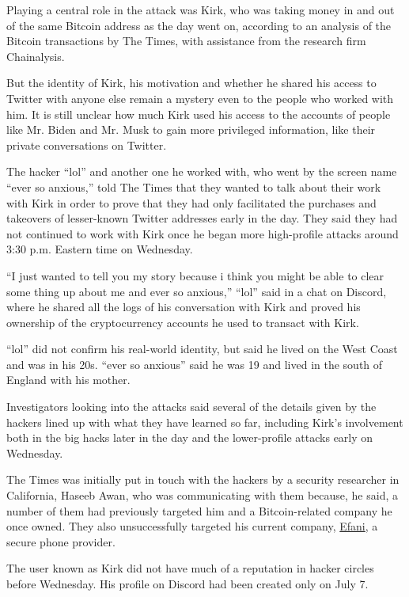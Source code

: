 Playing a central role in the attack was Kirk, who was taking money in
and out of the same Bitcoin address as the day went on, according to an
analysis of the Bitcoin transactions by The Times, with assistance from
the research firm Chainalysis.

But the identity of Kirk, his motivation and whether he shared his
access to Twitter with anyone else remain a mystery even to the people
who worked with him. It is still unclear how much Kirk used his access
to the accounts of people like Mr. Biden and Mr. Musk to gain more
privileged information, like their private conversations on Twitter.

The hacker ``lol'' and another one he worked with, who went by the
screen name ``ever so anxious,'' told The Times that they wanted to talk
about their work with Kirk in order to prove that they had only
facilitated the purchases and takeovers of lesser-known Twitter
addresses early in the day. They said they had not continued to work
with Kirk once he began more high-profile attacks around 3:30 p.m.
Eastern time on Wednesday.

``I just wanted to tell you my story because i think you might be able
to clear some thing up about me and ever so anxious,'' ``lol'' said in a
chat on Discord, where he shared all the logs of his conversation with
Kirk and proved his ownership of the cryptocurrency accounts he used to
transact with Kirk.

``lol'' did not confirm his real-world identity, but said he lived on
the West Coast and was in his 20s. ``ever so anxious'' said he was 19
and lived in the south of England with his mother.

Investigators looking into the attacks said several of the details given
by the hackers lined up with what they have learned so far, including
Kirk's involvement both in the big hacks later in the day and the
lower-profile attacks early on Wednesday.

The Times was initially put in touch with the hackers by a security
researcher in California, Haseeb Awan, who was communicating with them
because, he said, a number of them had previously targeted him and a
Bitcoin-related company he once owned. They also unsuccessfully targeted
his current company, \href{https://www.efani.com/}{Efani}, a secure
phone provider.

The user known as Kirk did not have much of a reputation in hacker
circles before Wednesday. His profile on Discord had been created only
on July 7.

